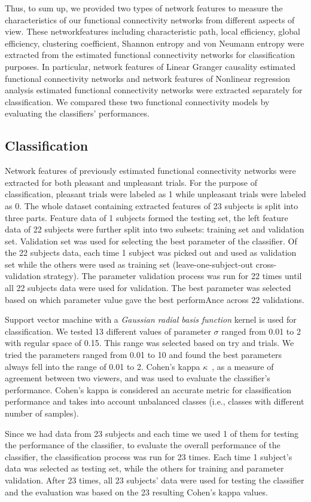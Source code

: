 Thus, to sum up, we provided two types of network features to measure the characteristics of our functional connectivity networks from different aspects of view. These networkfeatures including characteristic path, local efficiency, global efficiency, clustering coefficient, Shannon entropy and von Neumann entropy were extracted from the estimated functional connectivity networks for classification purposes. In particular, network features of Linear Granger causality estimated functional connectivity networks and network features of Nonlinear regression analysis estimated functional connectivity networks were extracted separately for classification. We compared these two functional connectivity models by evaluating the classifiers' performances. 

\subsection{Classification}
Network features of previously estimated functional connectivity networks were extracted for both pleasant and unpleasant trials. For the purpose of classification, pleasant trials were labeled as 1 while unpleasant trials were labeled as 0. The whole dataset containing extracted features of 23 subjects is split into three parts. Feature data of 1 subjects formed the testing set, the left feature data of 22 subjects were further split into two subsets: training set and validation set. Validation set was used for selecting the best parameter of the classifier. Of the 22 subjects data, each time 1 subject was picked out and used as validation set while the others were used as training set (leave-one-subject-out cross-validation strategy). The parameter validation process was run for 22 times until all 22 subjects data were used for validation. The best parameter was selected based on which parameter value gave the best performAnce across 22 validations.    

Support vector machine with a \emph{Gaussian radial basis function} kernel is used for classification. We tested 13 different values of parameter $\sigma$ ranged from 0.01 to 2 with regular space of 0.15. This range was selected based on try and trials. We tried the parameters ranged from 0.01 to 10 and found the best parameters always fell into the range of 0.01 to 2. Cohen's kappa $\kappa$~\cite{uebersax1987diversity}, as a measure of agreement between two viewers, and was used to evaluate the classifier's performance. Cohen's kappa is considered an accurate metric for classification performance and takes into account unbalanced classes (i.e., classes with different number of samples). 

Since we had data from 23 subjects and each time we used 1 of them for testing the performance of the classifier, to evaluate the overall performance of the classifier, the classification process was run for 23 times. Each time 1 subject's data was selected as testing set, while the others for training and parameter validation. After 23 times, all 23 subjects' data were used for testing the classifier and the evaluation was based on the 23 resulting Cohen's kappa values. 
